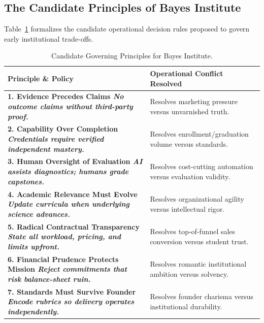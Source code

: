 \subsection{The Candidate Principles of Bayes Institute}

Table~\ref{tab:bayes-principles} formalizes the candidate operational decision rules proposed to govern early institutional trade-offs.

\begin{table}[htbp]
\centering
\begin{tcolorbox}[
  enhanced,
  colback=white,
  colframe=BayesBorder!80!white,
  boxrule=0.4pt,
  arc=2pt,
  left=3pt,right=3pt,top=3pt,bottom=3pt,
  before skip=3pt,after skip=4pt
]
\scriptsize
\setlength{\tabcolsep}{3pt}
\renewcommand{\arraystretch}{1.18}
\begin{tabularx}{\linewidth}{@{} >{\bfseries\color{BayesInk}}p{2.3cm} >{\color{BayesInk}}X @{}}
\toprule
\textbf{Principle \& Policy} & \textbf{Operational Conflict Resolved} \\
\midrule
1. Evidence Precedes Claims\newline
\textit{No outcome claims without third-party proof.} & 
Resolves marketing pressure versus unvarnished truth. \\
\midrule
2. Capability Over Completion\newline
\textit{Credentials require verified independent mastery.} & 
Resolves enrollment/graduation volume versus standards. \\
\midrule
3. Human Oversight of Evaluation\newline
\textit{AI assists diagnostics; humans grade capstones.} & 
Resolves cost-cutting automation versus evaluation validity. \\
\midrule
4. Academic Relevance Must Evolve\newline
\textit{Update curricula when underlying science advances.} & 
Resolves organizational agility versus intellectual rigor. \\
\midrule
5. Radical Contractual Transparency\newline
\textit{State all workload, pricing, and limits upfront.} & 
Resolves top-of-funnel sales conversion versus student trust. \\
\midrule
6. Financial Prudence Protects Mission\newline
\textit{Reject commitments that risk balance-sheet ruin.} & 
Resolves romantic institutional ambition versus solvency. \\
\midrule
7. Standards Must Survive Founder\newline
\textit{Encode rubrics so delivery operates independently.} & 
Resolves founder charisma versus institutional durability. \\
\bottomrule
\end{tabularx}
\end{tcolorbox}
\caption{Candidate Governing Principles for Bayes Institute.}
\label{tab:bayes-principles}
\end{table}

